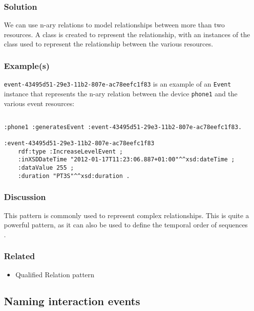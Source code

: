 \subsubsection{Solution}
We can use n-ary relations \cite{Noy2006} to model relationships between more than two resources. A class is created to represent the relationship, with an instances of the class used to represent the relationship between the various resources.

\subsubsection{Example(s)}
\texttt{event-43495d51-29e3-11b2-807e-ac78eefc1f83} is an example of an \texttt{Event} instance that represents the n-ary relation between the device \texttt{phone1} and the various event resources: 

\begin{verbatim}
	
:phone1 :generatesEvent :event-43495d51-29e3-11b2-807e-ac78eefc1f83. 
	
:event-43495d51-29e3-11b2-807e-ac78eefc1f83 
	rdf:type :IncreaseLevelEvent ;
	:inXSDDateTime "2012-01-17T11:23:06.887+01:00"^^xsd:dateTime ;
	:dataValue 255 ;
	:duration "PT3S"^^xsd:duration .
\end{verbatim}


\subsubsection{Discussion}
This pattern is commonly used to represent complex relationships. This is quite a powerful pattern, as it can also be used to define the temporal order of sequences \cite{Noy2006}.


\subsubsection{Related}

\begin{itemize}
	\item Qualified Relation pattern \cite{Dodds2011}
\end{itemize}






\subsection{Naming interaction events}


